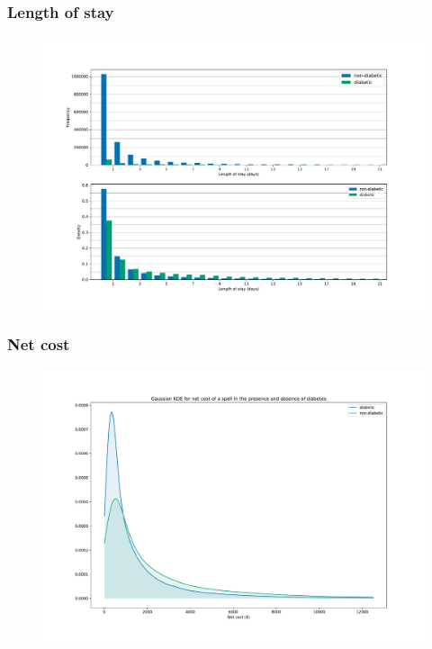 \documentclass{beamer}
\begin{document}
\begin{frame}
    \frametitle{Length of stay}

    \begin{figure}
    \includegraphics[width=\linewidth]{./img/diabetic_LOS_joint_hist.pdf}
    \end{figure}
\end{frame}

\begin{frame}
    \frametitle{Net cost}

    \begin{figure}
    \includegraphics[width=\linewidth]{./img/diabetic_netcost_kde.pdf}
    \end{figure}
\end{frame}
\end{document}
